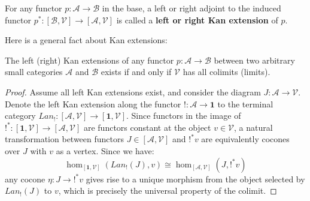 \begin{defn}
  For any functor $p : \mathcal{A} \to \mathcal{B}$ in the base, a left or right adjoint to the induced functor $p^* : [\mathcal{B}, \mathcal{V}] \to [\mathcal{A}, \mathcal{V}]$ is called a \textbf{left or right Kan extension} of $p$.
\end{defn}
Here is a general fact about Kan extensions:
  \begin{thm}\label{kanlimits}
    The left (right) Kan extensions of any functor $p : \mathcal{A} \to \mathcal{B}$ between two arbitrary small categories $\mathcal{A}$ and $\mathcal{B}$ exists if and only if $\mathcal{V}$ has all colimits (limits).
    \begin{proof}Assume all left Kan extensions exist, and consider the diagram $J : \mathcal{A} \to \mathcal{V}$. Denote the left Kan extension along the functor $! : \mathcal{A} \to \mathbf{1}$ to the terminal category $Lan_! : [\mathcal{A}, \mathcal{V}] \to [\mathbf{1}, \mathcal{V}]$. Since functors in the image of $!^* : [\mathbf{1}, \mathcal{V}] \to [\mathcal{A}, \mathcal{V}]$ are functors constant at the object $v \in \mathcal{V}$, a natural transformation between functors $J \in [\mathcal{A}, \mathcal{V}]$ and $!^*v$ are equivalently cocones over $J$ with $v$ as a vertex. Since we have:
      \[
        \hom_{[\mathbf{1},\mathcal{V}]}(Lan_!(J), v) \cong \hom_{[\mathcal{A},\mathcal{V}]}(J, !^*v)
      \]
      any cocone $\eta : J \to !^*v$ gives rise to a unique morphism from the object selected by $Lan_!(J)$ to $v$, which is precisely the universal property of the colimit.


\end{proof}
\end{thm}
